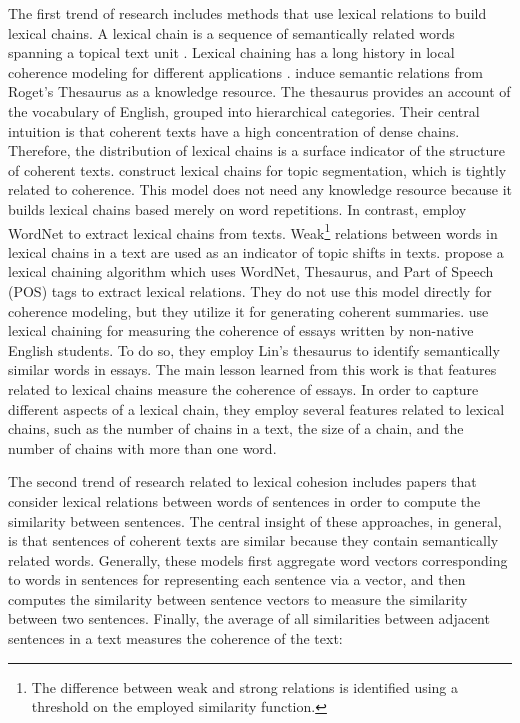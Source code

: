 The first trend of research includes methods that use lexical relations to build lexical chains. 
A lexical chain is a sequence of semantically related words spanning a topical text unit \cite{morris91}. 
Lexical chaining has a long history in local coherence modeling for different applications \cite{morris91,fenglijun09,wongbillytm12,benguosheng13,flor13}. 
 induce semantic relations from Roget's Thesaurus as a knowledge resource. 
The thesaurus provides an account of the vocabulary of English, grouped into hierarchical categories. 
Their central intuition is that coherent texts have a high concentration of dense chains. 
Therefore, the distribution of lexical chains is a surface indicator of the structure of coherent texts. 
 construct lexical chains for topic segmentation, which is tightly related to coherence. 
This model does not need any knowledge resource because it builds lexical chains based merely on word repetitions. 
In contrast,  employ WordNet to extract lexical chains from texts.  
Weak\footnote{The difference between weak and strong relations is identified using a threshold on the employed similarity function.} relations between words in lexical chains in a text are used as an indicator of topic shifts in texts. 
 propose a lexical chaining algorithm which uses WordNet, Thesaurus, and Part of Speech (POS) tags to extract lexical relations. 
They do not use this model directly for coherence modeling, but they utilize it for generating coherent summaries. 
 use lexical chaining for measuring the coherence of essays written by non-native English students. 
To do so, they employ Lin’s thesaurus \cite{lindekang98} to identify semantically similar words in essays.   
The main lesson learned from this work is that features related to lexical chains measure the coherence of essays. 
In order to capture different aspects of a lexical chain, they employ several features related to lexical chains, such as the number of chains in a text, the size of a chain, and the number of chains with more than one word. 

The second trend of research related to lexical cohesion includes papers that consider lexical relations between words of sentences in order to compute the similarity between sentences.    
The central insight of these approaches, in general, is that sentences of coherent texts are similar because they contain semantically related words. 
Generally, these models first aggregate word vectors corresponding to words in sentences for representing each sentence via a vector, and then computes the similarity between sentence vectors to measure the similarity between two sentences.  
Finally, the average of all similarities between adjacent sentences in a text measures the coherence of the text: 


